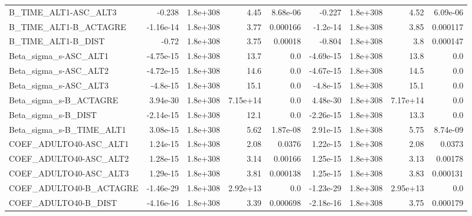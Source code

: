 \begin{tabular}{lrrrrrrrr}
B\_TIME\_ALT1-ASC\_ALT3              &      -0.238 &     1.8e+308 &      4.45 & 8.68e-06 &     -0.227 &    1.8e+308 &         4.52 &      6.09e-06 \\
B\_TIME\_ALT1-B\_ACTAGRE             &   -1.16e-14 &     1.8e+308 &      3.77 & 0.000166 &   -1.2e-14 &    1.8e+308 &         3.85 &      0.000117 \\
B\_TIME\_ALT1-B\_DIST                &       -0.72 &     1.8e+308 &      3.75 &  0.00018 &     -0.804 &    1.8e+308 &          3.8 &      0.000147 \\
Beta\_sigma\_s-ASC\_ALT1             &   -4.75e-15 &     1.8e+308 &      13.7 &      0.0 &  -4.69e-15 &    1.8e+308 &         13.8 &           0.0 \\
Beta\_sigma\_s-ASC\_ALT2             &   -4.72e-15 &     1.8e+308 &      14.6 &      0.0 &  -4.67e-15 &    1.8e+308 &         14.5 &           0.0 \\
Beta\_sigma\_s-ASC\_ALT3             &    -4.8e-15 &     1.8e+308 &      15.1 &      0.0 &   -4.8e-15 &    1.8e+308 &         15.1 &           0.0 \\
Beta\_sigma\_s-B\_ACTAGRE            &    3.94e-30 &     1.8e+308 &  7.15e+14 &      0.0 &   4.48e-30 &    1.8e+308 &     7.17e+14 &           0.0 \\
Beta\_sigma\_s-B\_DIST               &   -2.14e-15 &     1.8e+308 &      12.1 &      0.0 &  -2.26e-15 &    1.8e+308 &         13.3 &           0.0 \\
Beta\_sigma\_s-B\_TIME\_ALT1          &    3.08e-15 &     1.8e+308 &      5.62 & 1.87e-08 &   2.91e-15 &    1.8e+308 &         5.75 &      8.74e-09 \\
COEF\_ADULTO40-ASC\_ALT1            &    1.24e-15 &     1.8e+308 &      2.08 &   0.0376 &   1.22e-15 &    1.8e+308 &         2.08 &        0.0373 \\
COEF\_ADULTO40-ASC\_ALT2            &    1.28e-15 &     1.8e+308 &      3.14 &  0.00166 &   1.25e-15 &    1.8e+308 &         3.13 &       0.00178 \\
COEF\_ADULTO40-ASC\_ALT3            &    1.29e-15 &     1.8e+308 &      3.81 & 0.000138 &   1.25e-15 &    1.8e+308 &         3.83 &      0.000131 \\
COEF\_ADULTO40-B\_ACTAGRE           &   -1.46e-29 &     1.8e+308 &  2.92e+13 &      0.0 &  -1.23e-29 &    1.8e+308 &     2.95e+13 &           0.0 \\
COEF\_ADULTO40-B\_DIST              &   -4.16e-16 &     1.8e+308 &      3.39 & 0.000698 &  -2.18e-16 &    1.8e+308 &         3.75 &      0.000179 \\

\end{tabular}
